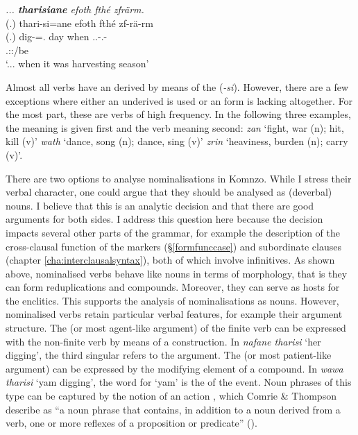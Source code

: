 \begin{exe}
	\ex \textit{... \textbf{tharisiane} efoth fthé zfrärm.}\\
	\glll (.) thari-si=ane efoth fthé zf-rä-rm\\
	(.) dig-\Nmlz{}=\Poss.\Sg{} day when \Tsg.\F.\Betatwo-\Cop.\Ndu-\Dur\\
	{} {} {} {} \footnotesize{\Tsg.\F:\Pst:\Dur/be}\\
	\trans `... when it was harvesting season'
	\label{ex011}
\end{exe}

Almost all verbs have an  derived by means of the  (\emph{-si}). However, there are a few exceptions where either an underived  is used or an  form is lacking altogether. For the most part, these are verbs of high frequency. In the following three examples, the  meaning is given first and the verb meaning second: \emph{zan} `fight, war (n); hit, kill (v)' \emph{wath} `dance, song (n); dance, sing (v)' \emph{zrin} `heaviness, burden (n); carry (v)'.%

There are two options to analyse nominalisations in Komnzo. While I stress their verbal character, one could argue that they should be analysed as (deverbal) nouns. I believe that this is an analytic decision and that there are good arguments for both sides. I address this question here because the decision impacts several other parts of the grammar, for example the description of the cross-clausal function of the  markers (\S\ref{formfunccase}) and subordinate clauses (chapter \ref{cha:interclausalsyntax}), both of which involve infinitives. As shown above, nominalised verbs behave like nouns in terms of morphology, that is they can form reduplications and  compounds. Moreover, they can serve as hosts for the  enclitics. This supports the analysis of nominalisations as nouns. However, nominalised verbs retain particular verbal features, for example their argument structure. The  (or most agent-like argument) of the finite verb can be expressed with the non-finite verb by means of a  construction. In \emph{nafane tharisi} `her digging', the third singular  refers to the  argument. The  (or most patient-like argument) can be expressed by the modifying element of a  compound. In \emph{wawa tharisi} `yam digging', the word for `yam' is the  of the event. Noun phrases of this type can be captured by the notion of an action , which Comrie \& Thompson describe as ``a noun phrase that contains, in addition to a noun derived from a verb, one or more reflexes of a proposition or predicate'' (\citeyear[343]{Comrie:2007nom}).%


